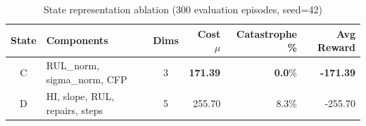\begin{table}[t]
\centering
\caption{State representation ablation (300 evaluation episodes, seed=42)}
\label{tab:state_ablation}
\begin{tabular}{clcrrr}
\toprule
\textbf{State} & \textbf{Components} & \textbf{Dims} & \textbf{Cost $\mu$} & \textbf{Catastrophe \%} & \textbf{Avg Reward} \\
\midrule
C & RUL_norm, sigma_norm, CFP & 3 & \textbf{171.39} & \textbf{0.0}\% & \textbf{-171.39} \\
D & HI, slope, RUL, repairs, steps & 5 & 255.70 & 8.3\% & -255.70   %
\bottomrule
\end{tabular}
\end{table}
